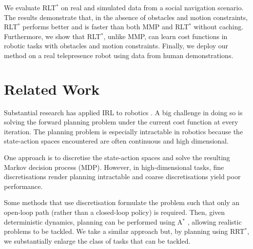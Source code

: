 \documentclass[letterpaper, 10 pt, conference]{ieeeconf}
\begin{document}
We evaluate RLT$^*$ on real and simulated data from a social navigation scenario. The results demonstrate that, in the absence of obstacles and motion constraints, RLT$^*$ performs better and is faster than both MMP and RLT$^*$ without caching. Furthermore, we show that RLT$^*$, unlike MMP, can learn cost functions in robotic tasks with obstacles and motion constraints. Finally, we deploy our method on a real telepresence robot using data from human demonstrations.




\section{Related Work \label{sec:related_work}}


Substantial research has applied IRL to robotics \cite{henry2010learning,abbeel2008apprenticeship,vasquez2014inverse}.
A big challenge in doing so is solving the forward planning problem under the current cost function at every iteration. The planning problem is especially intractable in robotics because the state-action spaces encountered are often continuous and high dimensional. %

One approach is to discretise the state-action spaces and solve the resulting Markov decision process (MDP). However, in high-dimensional tasks, fine discretisations render planning intractable and coarse discretisations yield poor performance.

Some methods that use discretisation formulate the problem such that only an open-loop path (rather than a closed-loop policy) is required. Then, given deterministic dynamics, planning can be performed using A$^*$ \cite{ratliff2006maximum}, allowing realistic problems to be tackled. We take a similar approach but, by planning using RRT$^*$, we substantially enlarge the class of tasks that can be tackled.
\end{document}

